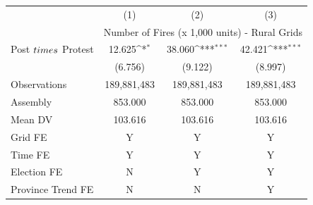 {
\def\sym#1{\ifmmode^{#1}\else\(^{#1}\)\fi}
\begin{tabular}{l*{3}{c}}
\hline
            &\multicolumn{1}{c}{(1)}         &\multicolumn{1}{c}{(2)}         &\multicolumn{1}{c}{(3)}         \\
            & \multicolumn{3}{c}{Number of Fires (x 1,000 units) - Rural Grids} \\ \hline

Post $\\times$ Protest&      12.625\sym{*}  &      38.060\sym{***}&      42.421\sym{***}\\
            &     (6.756)         &     (9.122)         &     (8.997)         \\
\hline
Observations& 189,881,483         & 189,881,483         & 189,881,483         \\
Assembly    &     853.000         &     853.000         &     853.000         \\
Mean DV     &     103.616         &     103.616         &     103.616         \\
Grid FE     &           Y         &           Y         &           Y         \\
Time FE     &           Y         &           Y         &           Y         \\
Election FE &           N         &           Y         &           Y         \\
Province Trend FE&           N         &           N         &           Y         \\
\hline
\end{tabular}
}
